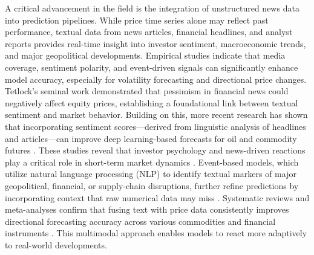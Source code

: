 \documentclass[12pt]{elsarticle}
\begin{document}
A critical advancement in the field is the integration of unstructured news data into prediction pipelines. While price time series alone may reflect past performance, textual data from news articles, financial headlines, and analyst reports provides real-time insight into investor sentiment, macroeconomic trends, and major geopolitical developments. Empirical studies indicate that media coverage, sentiment polarity, and event-driven signals can significantly enhance model accuracy, especially for volatility forecasting and directional price changes. Tetlock’s seminal work \cite{Tetlock2007} demonstrated that pessimism in financial news could negatively affect equity prices, establishing a foundational link between textual sentiment and market behavior. Building on this, more recent research has shown that incorporating sentiment scores—derived from linguistic analysis of headlines and articles—can improve deep learning-based forecasts for oil and commodity futures \cite{Li2021,Banerjee2024}. These studies reveal that investor psychology and news-driven reactions play a critical role in short-term market dynamics \cite{BOLLEN20111}. Event-based models, which utilize natural language processing (NLP) to identify textual markers of major geopolitical, financial, or supply-chain disruptions, further refine predictions by incorporating context that raw numerical data may miss \cite{Ding2015}. Systematic reviews and meta-analyses confirm that fusing text with price data consistently improves directional forecasting accuracy across various commodities and financial instruments \cite{Nassirtoussi2014,Chen2024}. This multimodal approach enables models to react more adaptively to real-world developments.
\end{document}
